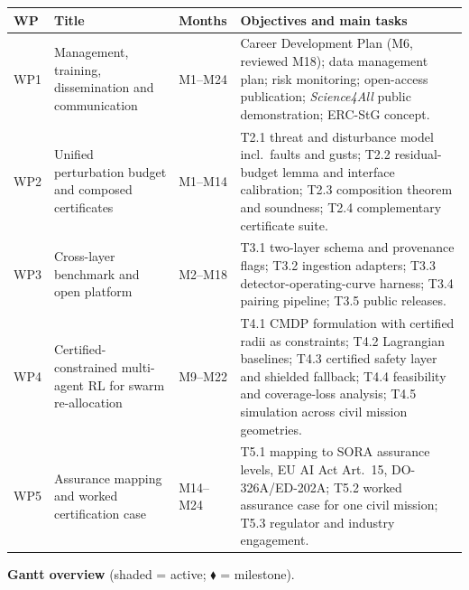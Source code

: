 \documentclass[11pt,a4paper]{article}
\begin{document}
\begin{center}
\begin{tabularx}{\linewidth}{@{}p{0.9cm}p{4.3cm}p{1.5cm}Y@{}}
\toprule
{}
\textbf{WP} & \textbf{Title} & \textbf{Months} & \textbf{Objectives and main tasks} \\
\midrule
WP1 & Management, training, dissemination and communication & M1--M24 & Career Development Plan (M6, reviewed M18); data management plan; risk monitoring; open-access publication; \emph{Science4All} public demonstration; ERC-StG concept. \\
WP2 & Unified perturbation budget and composed certificates & M1--M14 & T2.1 threat and disturbance model incl.\ faults and gusts; T2.2 residual-budget lemma and interface calibration; T2.3 composition theorem and soundness; T2.4 complementary certificate suite. \\
WP3 & Cross-layer benchmark and open platform & M2--M18 & T3.1 two-layer schema and provenance flags; T3.2 ingestion adapters; T3.3 detector-operating-curve harness; T3.4 pairing pipeline; T3.5 public releases. \\
WP4 & Certified-constrained multi-agent RL for swarm re-allocation & M9--M22 & T4.1 CMDP formulation with certified radii as constraints; T4.2 Lagrangian baselines; T4.3 certified safety layer and shielded fallback; T4.4 feasibility and coverage-loss analysis; T4.5 simulation across civil mission geometries. \\
WP5 & Assurance mapping and worked certification case & M14--M24 & T5.1 mapping to SORA assurance levels, EU AI Act Art.~15, DO-326A/ED-202A; T5.2 worked assurance case for one civil mission; T5.3 regulator and industry engagement. \\
\bottomrule
\end{tabularx}
\end{center}

\textbf{Gantt overview} (shaded = active; $\blacklozenge$ = milestone).
\end{document}
